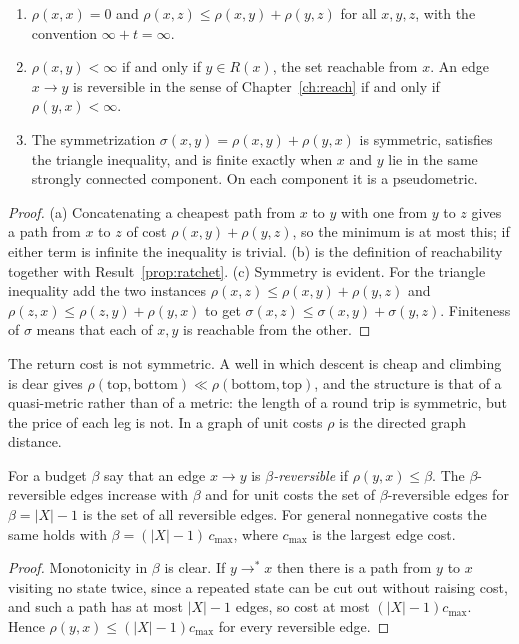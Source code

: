 \begin{newresult}\label{prop:quasi}
\begin{enumerate}[nosep,label=(\alph*)]
  \item $\rho(x,x)=0$ and $\rho(x,z)\le\rho(x,y)+\rho(y,z)$ for all $x,y,z$, with the convention $\infty+t=\infty$.
  \item $\rho(x,y)<\infty$ if and only if $y\in R(x)$, the set reachable from $x$. An edge $x\to y$ is reversible in the sense of Chapter~\ref{ch:reach} if and only if $\rho(y,x)<\infty$.
  \item The symmetrization $\sigma(x,y)=\rho(x,y)+\rho(y,x)$ is symmetric, satisfies the triangle inequality, and is finite exactly when $x$ and $y$ lie in the same strongly connected component. On each component it is a pseudometric.
\end{enumerate}
\end{newresult}
\begin{proof}
(a) Concatenating a cheapest path from $x$ to $y$ with one from $y$ to $z$ gives a path from $x$ to $z$ of cost $\rho(x,y)+\rho(y,z)$, so the minimum is at most this; if either term is infinite the inequality is trivial. (b) is the definition of reachability together with Result~\ref{prop:ratchet}. (c) Symmetry is evident. For the triangle inequality add the two instances $\rho(x,z)\le\rho(x,y)+\rho(y,z)$ and $\rho(z,x)\le\rho(z,y)+\rho(y,x)$ to get $\sigma(x,z)\le\sigma(x,y)+\sigma(y,z)$. Finiteness of $\sigma$ means that each of $x,y$ is reachable from the other.
\end{proof}

The return cost is not symmetric. A well in which descent is cheap and climbing is dear gives $\rho(\text{top},\text{bottom})\ll\rho(\text{bottom},\text{top})$, and the structure is that of a quasi-metric rather than of a metric: the length of a round trip is symmetric, but the price of each leg is not. In a graph of unit costs $\rho$ is the directed graph distance.

\begin{newresult}\label{prop:budget-cap}
For a budget $\beta$ say that an edge $x\to y$ is \emph{$\beta$-reversible} if $\rho(y,x)\le\beta$. The $\beta$-reversible edges increase with $\beta$ and for unit costs the set of $\beta$-reversible edges for $\beta=|X|-1$ is the set of all reversible edges. For general nonnegative costs the same holds with $\beta=(|X|-1)\,c_{\max}$, where $c_{\max}$ is the largest edge cost.
\end{newresult}
\begin{proof}
Monotonicity in $\beta$ is clear. If $y\to^{*}x$ then there is a path from $y$ to $x$ visiting no state twice, since a repeated state can be cut out without raising cost, and such a path has at most $|X|-1$ edges, so cost at most $(|X|-1)c_{\max}$. Hence $\rho(y,x)\le(|X|-1)c_{\max}$ for every reversible edge.
\end{proof}

